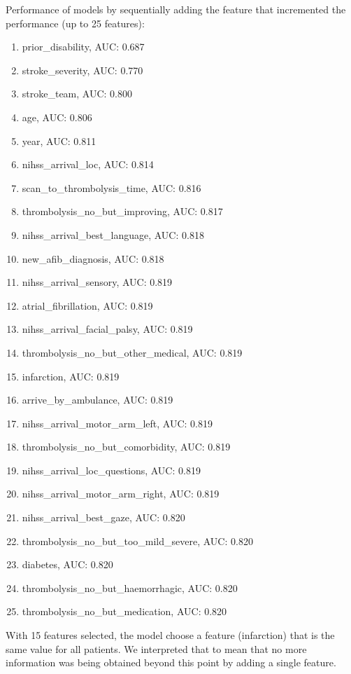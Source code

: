 Performance of models by sequentially adding the feature that incremented the performance (up to 25 features):
\begin{enumerate}
    \item prior\_disability, AUC: 0.687
    \item stroke\_severity, AUC: 0.770
    \item stroke\_team, AUC: 0.800
    \item age, AUC: 0.806
    \item year, AUC: 0.811
    \item nihss\_arrival\_loc, AUC: 0.814
    \item scan\_to\_thrombolysis\_time, AUC: 0.816
    \item thrombolysis\_no\_but\_improving, AUC: 0.817
    \item nihss\_arrival\_best\_language, AUC: 0.818
    \item new\_afib\_diagnosis, AUC: 0.818
    \item nihss\_arrival\_sensory, AUC: 0.819
    \item atrial\_fibrillation, AUC: 0.819
    \item nihss\_arrival\_facial\_palsy, AUC: 0.819
    \item thrombolysis\_no\_but\_other\_medical, AUC: 0.819
    \item infarction, AUC: 0.819
    \item arrive\_by\_ambulance, AUC: 0.819
    \item nihss\_arrival\_motor\_arm\_left, AUC: 0.819
    \item thrombolysis\_no\_but\_comorbidity, AUC: 0.819
    \item nihss\_arrival\_loc\_questions, AUC: 0.819
    \item nihss\_arrival\_motor\_arm\_right, AUC: 0.819
    \item nihss\_arrival\_best\_gaze, AUC: 0.820
    \item thrombolysis\_no\_but\_too\_mild\_severe, AUC: 0.820
    \item diabetes, AUC: 0.820
    \item thrombolysis\_no\_but\_haemorrhagic, AUC: 0.820
    \item thrombolysis\_no\_but\_medication, AUC: 0.820
\end{enumerate}

 With 15 features selected, the model choose a feature (infarction) that is the same value for all patients. We interpreted that to mean that no more information was being obtained beyond this point by adding a single feature.
 
